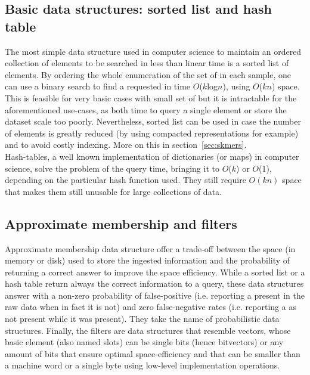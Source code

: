 \subsection{Basic data structures: sorted list and hash table}
The most simple data structure used in computer science to maintain an ordered collection of elements to be searched in less than linear time is a sorted list of elements. By ordering the whole enumeration of the set of \kmers in each sample, one can use a binary search to find a requested \kmer in time $O$($k$log$n$), using $O$($kn$) space. This is feasible for very basic cases with small set of \kmers but it is intractable for the aforementioned use-cases, as both time to query a single element or store the dataset scale too poorly. Nevertheless, sorted list can be used in case the number of elements is greatly reduced (by using compacted \kmer representations for example) and to avoid costly indexing. More on this in section~\ref{sec:skmers}.\\
Hash-tables, a well known implementation of dictionaries (or maps) in computer science, solve the problem of the query time, bringing it to $O$($k$) or $O$(1), depending on the particular hash function used. They still require $O(kn)$ space that makes them still unusable for large collections of data. 

\subsection{Approximate membership and filters}
Approximate membership data structure offer a trade-off between the space (in memory or disk) used to store the ingested information and the probability of returning a correct answer
to improve the space efficiency. While a sorted list or a hash table return always the correct information to a query, these data structures answer with a non-zero probability of false-positive (i.e. reporting a \kmer present in the raw data when in fact it is not) and zero false-negative rates (i.e. reporting a \kmer as not present while it was present). They take the name of probabilistic data structures. Finally, the filters are data structures that resemble vectors, whose basic element (also named slots) can be single bits (hence bitvectors) or any amount of bits that ensure optimal space-efficiency and that can be smaller than a machine word or a single byte using low-level implementation operations.

